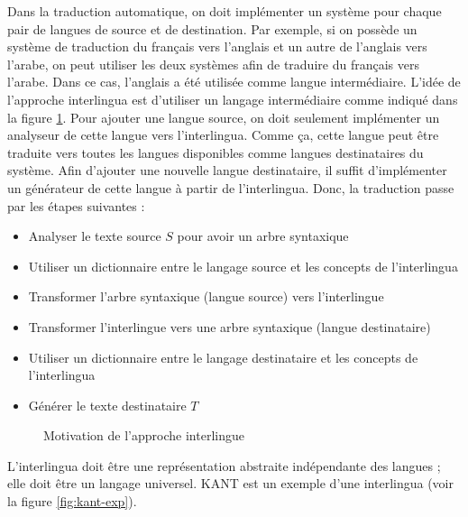 \documentclass{KodeBook}
\begin{document}
Dans la traduction automatique, on doit implémenter un système pour chaque pair de langues de source et de destination. 
Par exemple, si on possède un système de traduction du français vers l'anglais et un autre de l'anglais vers l'arabe, on peut utiliser les deux systèmes afin de traduire du français vers l'arabe. 
Dans ce cas, l'anglais a été utilisée comme langue intermédiaire. 
L'idée de l'approche interlingua est d'utiliser un langage intermédiaire comme indiqué dans la figure \ref{fig:mt-interlangue}.
Pour ajouter une langue source, on doit seulement implémenter un analyseur de cette langue vers l'interlingua. 
Comme ça, cette langue peut être traduite vers toutes les langues disponibles comme langues destinataires du système. 
Afin d'ajouter une nouvelle langue destinataire, il suffit d'implémenter un générateur de cette langue à partir de l'interlingua. 
Donc, la traduction passe par les étapes suivantes :
\begin{itemize}
	\item Analyser le texte source $S$ pour avoir un arbre syntaxique
	\item Utiliser un dictionnaire entre le langage source et les concepts de l'interlingua 
	\item Transformer l'arbre syntaxique (langue source) vers l'interlingue
	\item Transformer l'interlingue vers une arbre syntaxique (langue destinataire)
	\item Utiliser un dictionnaire entre le langage destinataire et les concepts de l'interlingua 
	\item Générer le texte destinataire $T$
\end{itemize}

\begin{figure}[!ht]
	\centering
	\caption{Motivation de l'approche interlingue}
	\label{fig:mt-interlangue}
\end{figure}

L'interlingua doit être une représentation abstraite indépendante des langues ; elle doit être un langage universel.
KANT \cite{98-czuba-al} est un exemple d'une interlingua (voir la figure \ref{fig:kant-exp}).
\end{document}
